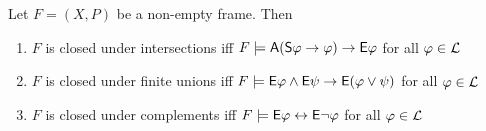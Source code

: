 \begin{proposition}
\label{prop_frame_conditions}

    Let $F = (X, P)$ be a non-empty frame. Then

    \begin{enumerate}\small

        \item\label{item_frame_condition_intersections} $F$ is closed under
            intersections iff $F \models \mathsf{A}(\mathsf{S}\varphi \to \varphi) \to
            \mathsf{E}\varphi$ for all $\varphi \in \mathcal{L}$

        \item\label{item_frame_condition_finunions} $F$ is closed under finite
            unions iff $F \models \mathsf{E}\varphi \land \mathsf{E}\psi \to \mathsf{E}(\varphi \lor
            \psi)$ for all $\varphi \in \mathcal{L}$

        \item\label{item_frame_condition_compl} $F$ is closed under complements
            iff $F \models \mathsf{E}\varphi \leftrightarrow \mathsf{E}\neg\varphi$ for all $\varphi \in \mathcal{L}$

    \end{enumerate}
\end{proposition}

